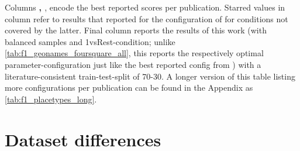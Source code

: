 \begin{table}[H]
{	Columns \textbf{\cite{Derrac2015}, \cite{Ager2018}}, \textbf{\cite{Alshaikh2020}} encode the best reported scores per publication. Starred values in column \textbf{\cite{Derrac2015}} refer to results that \cite{Ager2018} reported for the configuration of \cite{Derrac2015} for conditions not covered by the latter. Final column reports the results of this work (with balanced samples and 1vsRest-condition; unlike \autoref{tab:f1_geonames_foursquare_all}, this reports the respectively optimal parameter-configuration just like the best reported config from \mainalgos) with a literature-consistent train-test-split of 70-30. A longer version of this table listing more configurations per publication can be found in the Appendix as \autoref{tab:f1_placetypes_long}.}
	\label{tab:f1_mainalgos_me_short}
\end{table}





\section{Dataset differences} %
\label{sec:results_datasetdiffs}

